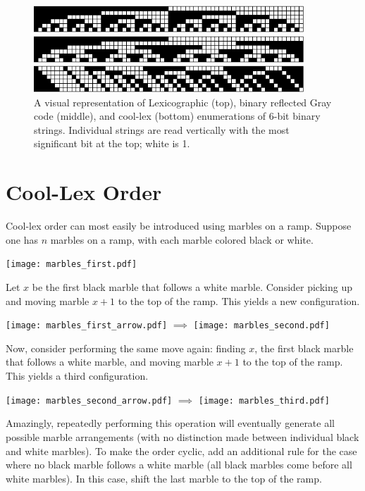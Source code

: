 \begin{figure}
    \centering
\includegraphics[width=4in]{BLX6-cropped.pdf} 

\includegraphics[width=4in]{BRGC6-cropped.pdf} 

\includegraphics[width=4in]{BCLX6-cropped.pdf} 

    \caption{A visual representation of Lexicographic (top), binary reflected Gray code (middle), and cool-lex (bottom) enumerations of 6-bit binary strings. Individual strings are read vertically with the most significant bit at the top; white is 1.
    }
    \label{binary}
\end{figure}

\section{Cool-Lex Order} \label{sec:coolIntro}

Cool-lex order can most easily be introduced using marbles on a ramp. Suppose one has $n$ marbles on a ramp, with each marble colored black or white.  

\texttt{[image: marbles\_first.pdf]} 


Let $x$ be the first black marble that follows a white marble. Consider picking up and moving marble $x+1$ to the top of the ramp. This yields a new configuration.

\texttt{[image: marbles\_first\_arrow.pdf]} $\implies$
\texttt{[image: marbles\_second.pdf]} 

Now, consider performing the same move again: finding $x$, the first black marble that follows a white marble, and moving marble $x+1$ to the top of the ramp. This yields a third configuration.

\texttt{[image: marbles\_second\_arrow.pdf]} $\implies$
\texttt{[image: marbles\_third.pdf]} 

Amazingly, repeatedly performing this operation will eventually generate all possible marble arrangements (with no distinction made between individual black and white marbles). To make the order cyclic, add an additional rule for the case where no black marble follows a white marble (all black marbles come before all white marbles).  In this case, shift the last marble to the top of the ramp.

